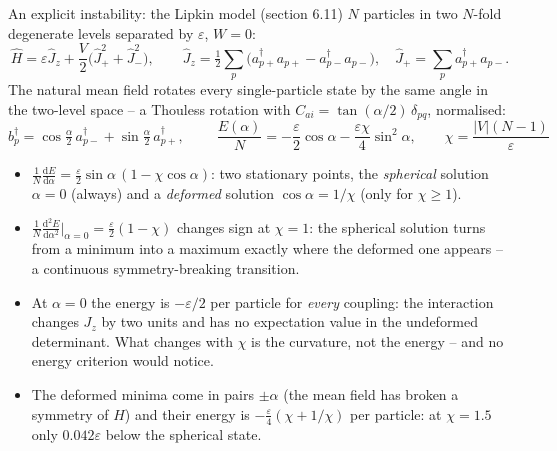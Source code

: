 \documentclass[aspectratio=169,10pt]{beamer}
\newcommand{\dd}{\mathrm{d}}
\begin{document}
\begin{frame}{An explicit instability: the Lipkin model (section 6.11)}
  \footnotesize
  $N$ particles in two $N$-fold degenerate levels separated by $\varepsilon$, $W=0$:
  \[
    \hat{H}=\varepsilon\hat{J}_z+\frac{V}{2}\bigl(\hat{J}_+^2+\hat{J}_-^2\bigr),
    \qquad
    \hat{J}_z=\tfrac12\sum_p\bigl(a_{p+}^{\dagger}a_{p+}-a_{p-}^{\dagger}a_{p-}\bigr),\quad
    \hat{J}_+=\sum_pa_{p+}^{\dagger}a_{p-}.
  \]
  The natural mean field rotates every single-particle state by the same angle in the two-level space -- a Thouless rotation with $C_{ai}=\tan(\alpha/2)\,\delta_{pq}$, normalised:
  \[
    b_p^{\dagger}=\cos\tfrac{\alpha}{2}\,a_{p-}^{\dagger}+\sin\tfrac{\alpha}{2}\,a_{p+}^{\dagger},
    \qquad
    \boxed{\;\frac{E(\alpha)}{N}=-\frac{\varepsilon}{2}\cos\alpha-\frac{\varepsilon\chi}{4}\sin^2\alpha,\qquad\chi=\frac{|V|(N-1)}{\varepsilon}\;}
  \]
  \begin{itemize}
    \item $\frac1N\frac{\dd E}{\dd\alpha}=\frac{\varepsilon}{2}\sin\alpha\,(1-\chi\cos\alpha)$: two stationary points, the \emph{spherical} solution $\alpha=0$ (always) and a \emph{deformed} solution $\cos\alpha=1/\chi$ (only for $\chi\ge1$).
    \item $\frac1N\frac{\dd^2E}{\dd\alpha^2}\big|_{\alpha=0}=\frac{\varepsilon}{2}(1-\chi)$ changes sign at $\chi=1$: the spherical solution turns from a minimum into a maximum exactly where the deformed one appears -- a continuous symmetry-breaking transition.
    \item At $\alpha=0$ the energy is $-\varepsilon/2$ per particle for \emph{every} coupling: the interaction changes $J_z$ by two units and has no expectation value in the undeformed determinant. \alert{What changes with $\chi$ is the curvature, not the energy} -- and no energy criterion would notice.
    \item The deformed minima come in pairs $\pm\alpha$ (the mean field has broken a symmetry of $\hat{H}$) and their energy is $-\frac{\varepsilon}{4}(\chi+1/\chi)$ per particle: at $\chi=1.5$ only $0.042\varepsilon$ below the spherical state.
  \end{itemize}
\end{frame}
\end{document}
